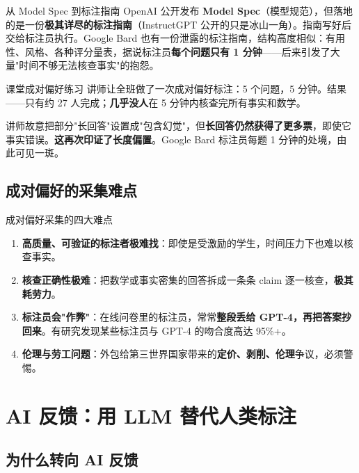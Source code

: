 \documentclass[a4paper]{article}
\begin{document}
\vspace{0.3cm}

\begin{importantbox}{从 Model Spec 到标注指南}
OpenAI 公开发布 \textbf{Model Spec}（模型规范），但落地的是一份\textbf{极其详尽的标注指南}（InstructGPT 公开的只是冰山一角）。指南写好后交给标注员执行。Google Bard 也有一份泄露的标注指南，结构高度相似：有用性、风格、各种评分量表，据说标注员\textbf{每个问题只有 1 分钟}——后来引发了大量"时间不够无法核查事实"的抱怨。
\end{importantbox}

\begin{practicebox}{课堂成对偏好练习}
讲师让全班做了一次成对偏好标注：5 个问题，5 分钟。结果——只有约 27 人完成；\textbf{几乎没人}在 5 分钟内核查完所有事实和数学。

讲师故意把部分"长回答"设置成"包含幻觉"，但\textbf{长回答仍然获得了更多票}，即使它事实错误。\textbf{这再次印证了长度偏置}。Google Bard 标注员每题 1 分钟的处境，由此可见一斑。
\end{practicebox}

\subsection{成对偏好的采集难点}

\begin{warningbox}{成对偏好采集的四大难点}
\begin{enumerate}
\item \textbf{高质量、可验证的标注者极难找}：即使是受激励的学生，时间压力下也难以核查事实。
\item \textbf{核查正确性极难}：把数学或事实密集的回答拆成一条条 claim 逐一核查，\textbf{极其耗劳力}。
\item \textbf{标注员会"作弊"}：在线问卷里的标注员，常常\textbf{整段丢给 GPT-4，再把答案抄回来}。有研究发现某些标注员与 GPT-4 的吻合度高达 95\%+。
\item \textbf{伦理与劳工问题}：外包给第三世界国家带来的\textbf{定价、剥削、伦理}争议，必须警惕。
\end{enumerate}
\end{warningbox}

\section{AI 反馈：用 LLM 替代人类标注}

\subsection{为什么转向 AI 反馈}
\end{document}
